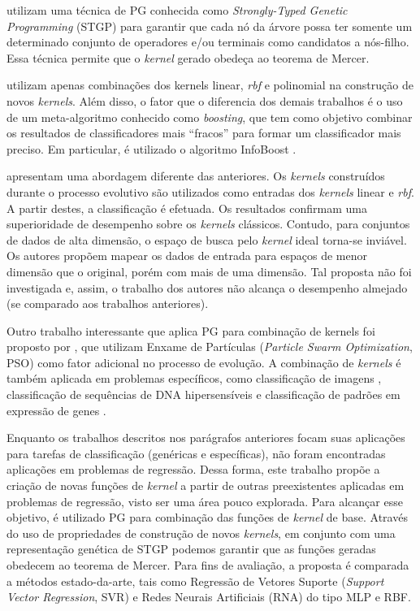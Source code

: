  utilizam uma técnica de PG conhecida como \textit{Strongly-Typed Genetic Programming} (STGP) para garantir que cada nó da árvore possa ter somente um determinado conjunto de operadores e/ou terminais como candidatos a nós-filho. Essa técnica permite que o \textit{kernel} gerado obedeça ao teorema de Mercer.

 utilizam apenas combinações dos kernels linear, \textit{rbf} e polinomial na construção de novos \textit{kernels}. Além disso, o fator que o diferencia dos demais trabalhos é o uso de um meta-algoritmo conhecido como \textit{boosting}, que tem como objetivo combinar os resultados de classificadores mais ``fracos'' para formar um classificador mais preciso. Em particular, é utilizado o algoritmo InfoBoost \cite{aslam2000}.

 apresentam uma abordagem diferente das anteriores. Os \textit{kernels} construídos durante o processo evolutivo são utilizados como entradas dos \textit{kernels} linear e \textit{rbf}. A partir destes, a classificação é efetuada. Os resultados confirmam uma superioridade de desempenho sobre os \textit{kernels} clássicos. Contudo, para conjuntos de dados de alta dimensão, o espaço de busca pelo \textit{kernel} ideal torna-se inviável. Os autores propõem mapear os dados de entrada para espaços de menor dimensão que o original, porém com mais de uma dimensão. Tal proposta não foi investigada e, assim, o trabalho dos autores não alcança o desempenho almejado (se comparado aos trabalhos anteriores).

Outro trabalho interessante que aplica PG para combinação de kernels foi proposto por , que utilizam Enxame de Partículas (\textit{Particle Swarm Optimization}, PSO) como fator adicional no processo de evolução. A combinação de \textit{kernels} é também aplicada em problemas específicos, como classificação de imagens \cite{ribeiro2015}, classificação de sequências de DNA hipersensíveis \cite{kamath2011} e classificação de padrões em expressão de genes \cite{cuong2006}.

Enquanto os trabalhos descritos nos parágrafos anteriores focam suas aplicações para tarefas de classificação (genéricas e específicas), não foram encontradas aplicações em problemas de regressão. Dessa forma, este trabalho propõe a criação de novas funções de \textit{kernel} a partir de outras preexistentes aplicadas em problemas de regressão, visto ser uma área pouco explorada. Para alcançar esse objetivo, é utilizado PG para combinação das funções de \textit{kernel} de base. Através do uso de propriedades de construção de novos \textit{kernels}, em conjunto com uma representação genética de STGP podemos garantir que as funções geradas obedecem ao teorema de Mercer. Para fins de avaliação, a proposta é comparada a métodos estado-da-arte, tais como Regressão de Vetores Suporte (\textit{Support Vector Regression}, SVR) e Redes Neurais Artificiais (RNA) do tipo MLP e RBF.

